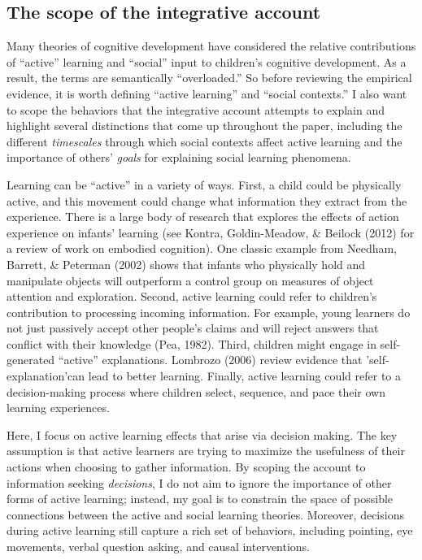 \documentclass[oneside]{report}
\begin{document}
\hypertarget{the-scope-of-the-integrative-account}{%
\subsection{The scope of the integrative
account}\label{the-scope-of-the-integrative-account}}

Many theories of cognitive development have considered the relative
contributions of ``active'' learning and ``social'' input to children's
cognitive development. As a result, the terms are semantically
``overloaded.'' So before reviewing the empirical evidence, it is worth
defining ``active learning'' and ``social contexts.'' I also want to
scope the behaviors that the integrative account attempts to explain and
highlight several distinctions that come up throughout the paper,
including the different \emph{timescales} through which social contexts
affect active learning and the importance of others' \emph{goals} for
explaining social learning phenomena.

Learning can be ``active'' in a variety of ways. First, a child could be
physically active, and this movement could change what information they
extract from the experience. There is a large body of research that
explores the effects of action experience on infants' learning (see
Kontra, Goldin-Meadow, \& Beilock (2012) for a review of work on
embodied cognition). One classic example from Needham, Barrett, \&
Peterman (2002) shows that infants who physically hold and manipulate
objects will outperform a control group on measures of object attention
and exploration. Second, active learning could refer to children's
contribution to processing incoming information. For example, young
learners do not just passively accept other people's claims and will
reject answers that conflict with their knowledge (Pea, 1982). Third,
children might engage in self-generated ``active'' explanations.
Lombrozo (2006) review evidence that 'self-explanation'can lead to
better learning. Finally, active learning could refer to a
decision-making process where children select, sequence, and pace their
own learning experiences.

Here, I focus on active learning effects that arise via decision making.
The key assumption is that active learners are trying to maximize the
usefulness of their actions when choosing to gather information. By
scoping the account to information seeking \emph{decisions}, I do not
aim to ignore the importance of other forms of active learning; instead,
my goal is to constrain the space of possible connections between the
active and social learning theories. Moreover, decisions during active
learning still capture a rich set of behaviors, including pointing, eye
movements, verbal question asking, and causal interventions.
\end{document}
